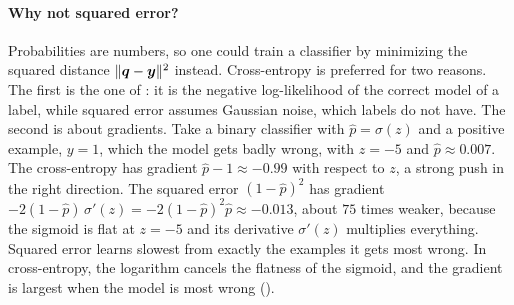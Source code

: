 \paragraph{Why not squared error?}
Probabilities are numbers, so one could train a classifier by minimizing
the squared distance $\|\bm{q} - \bm{y}\|^2$ instead. Cross-entropy is
preferred for two reasons. The first is the one of : it
is the negative log-likelihood of the correct model of a label, while
squared error assumes Gaussian noise, which labels do not have. The
second is about gradients. Take a binary classifier with $\hat{p} =
\sigma(z)$ and a positive example, $y = 1$, which the model gets badly
wrong, with $z = -5$ and $\hat{p} \approx 0.007$. The cross-entropy has
gradient $\hat{p} - 1 \approx -0.99$ with respect to $z$, a strong push
in the right direction. The squared error $(1 - \hat{p})^2$ has gradient
$-2(1 - \hat{p})\,\sigma'(z) = -2(1 - \hat{p})^2 \hat{p} \approx -0.013$,
about $75$ times weaker, because the sigmoid is flat at $z = -5$ and its
derivative $\sigma'(z)$ multiplies everything. Squared error learns
slowest from exactly the examples it gets most wrong. In cross-entropy,
the logarithm cancels the flatness of the sigmoid, and the gradient is
largest when the model is most wrong ().

